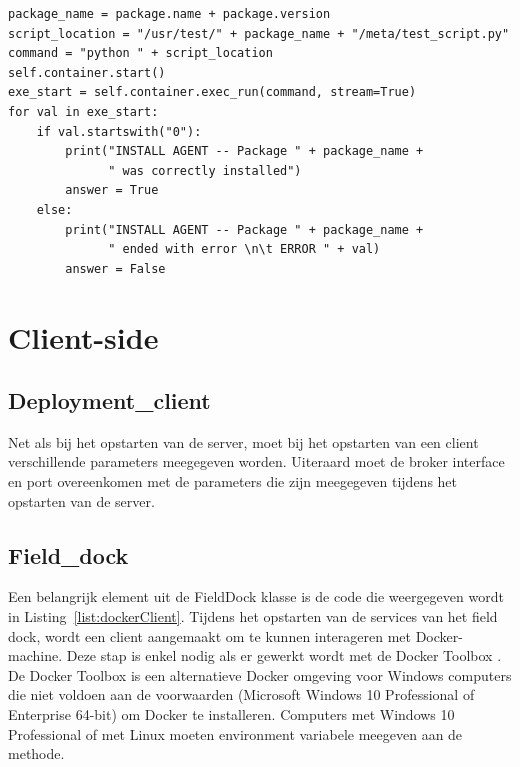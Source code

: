 \begin{minipage}{\linewidth}
\begin{center}
\begin{lstlisting}[captionpos=b,caption={Controle van een pakket},label={list:checkPackage}]
package_name = package.name + package.version
script_location = "/usr/test/" + package_name + "/meta/test_script.py"
command = "python " + script_location
self.container.start()
exe_start = self.container.exec_run(command, stream=True)
for val in exe_start:
    if val.startswith("0"):
        print("INSTALL AGENT -- Package " + package_name +
              " was correctly installed")
        answer = True
    else:
        print("INSTALL AGENT -- Package " + package_name +
              " ended with error \n\t ERROR " + val)
        answer = False
\end{lstlisting}
\end{center}
\end{minipage}

\section{Client-side}
\subsection{Deployment\_client}
Net als bij het opstarten van de server, moet bij het opstarten van een client verschillende parameters meegegeven worden.
Uiteraard moet de broker interface en port overeenkomen met de parameters die zijn meegegeven tijdens het opstarten van de server.


\subsection{Field\_dock}
Een belangrijk element uit de FieldDock klasse is de code die weergegeven wordt in Listing~\ref{list:dockerClient}.
Tijdens het opstarten van de services van het field dock, wordt een client aangemaakt om te kunnen interageren met Docker-machine.
Deze stap is enkel nodig als er gewerkt wordt met de Docker Toolbox \citep{dockertoolbox}.
De Docker Toolbox is een alternatieve Docker omgeving voor Windows computers die niet voldoen aan de voorwaarden (Microsoft Windows 10 Professional of Enterprise 64-bit) om Docker te installeren.
Computers met Windows 10 Professional of met Linux moeten environment variabele meegeven aan de methode.

